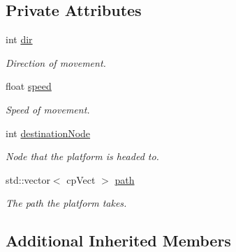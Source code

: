 \subsection*{Private Attributes}
\begin{DoxyCompactItemize}
\item 
int \hyperlink{class_moving_platform_a58664732e195a862557bf26f68b7a8ef}{dir}\hypertarget{class_moving_platform_a58664732e195a862557bf26f68b7a8ef}{}\label{class_moving_platform_a58664732e195a862557bf26f68b7a8ef}

\begin{DoxyCompactList}\small\item\em Direction of movement. \end{DoxyCompactList}\item 
float \hyperlink{class_moving_platform_a71db6ff1f8e4b94445e096ca62d79df4}{speed}\hypertarget{class_moving_platform_a71db6ff1f8e4b94445e096ca62d79df4}{}\label{class_moving_platform_a71db6ff1f8e4b94445e096ca62d79df4}

\begin{DoxyCompactList}\small\item\em Speed of movement. \end{DoxyCompactList}\item 
int \hyperlink{class_moving_platform_af5cbf79f35bbaf062069d66ac0d566ea}{destination\+Node}\hypertarget{class_moving_platform_af5cbf79f35bbaf062069d66ac0d566ea}{}\label{class_moving_platform_af5cbf79f35bbaf062069d66ac0d566ea}

\begin{DoxyCompactList}\small\item\em Node that the platform is headed to. \end{DoxyCompactList}\item 
std\+::vector$<$ cp\+Vect $>$ \hyperlink{class_moving_platform_a35dc1c58256404b865365f634588ce38}{path}\hypertarget{class_moving_platform_a35dc1c58256404b865365f634588ce38}{}\label{class_moving_platform_a35dc1c58256404b865365f634588ce38}

\begin{DoxyCompactList}\small\item\em The path the platform takes. \end{DoxyCompactList}\end{DoxyCompactItemize}
\subsection*{Additional Inherited Members}


